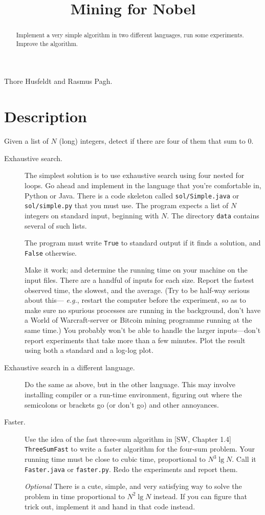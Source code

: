 \documentclass{tufte-handout}
\title{Mining for Nobel}
\begin{document}
\begin{abstract}
  Implement a very simple algorithm in two different languages, run some experiments.
  Improve the algorithm.
\end{abstract}

 \bigskip Thore Husfeldt and Rasmus Pagh.

 \section{Description}

 Given a list of $N$ (long) integers, detect if there are four of them that sum to $0$.

\begin{description}
  \item[Exhaustive search.]
 The simplest solution is to use exhaustive search using four nested
for loops.
Go ahead and implement in the language that you’re comfortable in, Python or Java.
There is a code skeleton called \texttt{sol/Simple.java} or \texttt{sol/simple.py} that you must use.
The program expects a list of $N$ integers on standard input, beginning with $N$.
The directory \texttt{data} contains several of such lists.

The program must write \texttt{True} to standard output if it finds a solution, and \texttt{False} otherwise.

Make it work; and determine the running time on your machine on the input files. 
There are a handful of inputs for each size.
Report the fastest observed time, the slowest, and the average.
(Try to be half-way serious about this--- \emph{e.g.}, restart the computer before the experiment, so as to make sure no spurious processes are running in the background, don’t have a World of Warcraft-server or Bitcoin mining programme running at the same time.)
You probably won’t be able to handle the larger inputs---don’t report experiments that take more than a few minutes.
Plot the result using both a standard and a log-log plot.

\item[Exhaustive search in a different language.]
  Do the same as above, but in the other language.
  This may involve installing compiler or a run-time environment, figuring out where the semicolons or brackets go (or don’t go) and other annoyances.

\item[Faster.]
  Use the idea of the fast three-sum algorithm in [SW, Chapter 1.4] \texttt{
  ThreeSumFast} to write a faster algorithm for the four-sum problem.
  Your running time must be close to cubic time, proportional to $N^3\operatorname{lg} N$.
  Call it \texttt{Faster.java}  or \texttt{faster.py}.
  Redo the experiments and report them.

  \emph{Optional} There is a cute, simple, and very satisfying way to solve the problem in time proportional to $N^2\operatorname{lg} N$ instead.
If you can figure that trick out, implement it and hand in that code instead.
\end{description}
\end{document}
